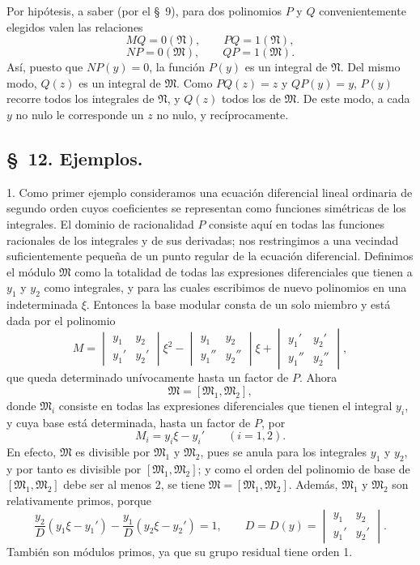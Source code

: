 Por hipótesis, a saber (por el \S~9), para dos polinomios $P$ y $Q$ convenientemente elegidos valen las relaciones
\[
 MQ=0(\mathfrak N),
 \qquad
 PQ=1(\mathfrak N),
\]
\[
 NP=0(\mathfrak M),
 \qquad
 QP=1(\mathfrak M).
\]
Así, puesto que $NP(y)=0$, la función $P(y)$ es un integral de $\mathfrak N$. Del mismo modo, $Q(z)$ es un integral de $\mathfrak M$. Como $PQ(z)=z$ y $QP(y)=y$, $P(y)$ recorre todos los integrales de $\mathfrak N$, y $Q(z)$ todos los de $\mathfrak M$. De este modo, a cada $y$ no nulo le corresponde un $z$ no nulo, y recíprocamente.

\subsection*{\S~12. Ejemplos.}

1. Como primer ejemplo consideramos una ecuación diferencial lineal ordinaria de segundo orden cuyos coeficientes se representan como funciones simétricas de los integrales. El dominio de racionalidad $P$ consiste aquí en todas las funciones racionales de los integrales y de sus derivadas; nos restringimos a una vecindad suficientemente pequeña de un punto regular de la ecuación diferencial. Definimos el módulo $\mathfrak M$ como la totalidad de todas las expresiones diferenciales que tienen a $y_1$ y $y_2$ como integrales, y para las cuales escribimos de nuevo polinomios en una indeterminada $\xi$. Entonces la base modular consta de un solo miembro y está dada por el polinomio
\[
 M=
 \begin{vmatrix} y_1&y_2\\ y_1'&y_2'\end{vmatrix}\xi^2
 -\begin{vmatrix} y_1&y_2\\ y_1''&y_2''\end{vmatrix}\xi
 +\begin{vmatrix} y_1'&y_2'\\ y_1''&y_2''\end{vmatrix},
\]
que queda determinado unívocamente hasta un factor de $P$. Ahora
\begin{equation}
 \mathfrak M=[\mathfrak M_1,
\mathfrak M_2],
\tag{41}
\end{equation}
donde $\mathfrak M_i$ consiste en todas las expresiones diferenciales que tienen el integral $y_i$, y cuya base está determinada, hasta un factor de $P$, por
\[
 M_i=y_i\xi-y_i'
 \qquad(i=1,2).
\]
En efecto, $\mathfrak M$ es divisible por $\mathfrak M_1$ y $\mathfrak M_2$, pues se anula para los integrales $y_1$ y $y_2$, y por tanto es divisible por $[\mathfrak M_1,\mathfrak M_2]$; y como el orden del polinomio de base de $[\mathfrak M_1,\mathfrak M_2]$ debe ser al menos 2, se tiene $\mathfrak M=[\mathfrak M_1,\mathfrak M_2]$. Además, $\mathfrak M_1$ y $\mathfrak M_2$ son relativamente primos, porque
\begin{equation}
 \frac{y_2}{D}(y_1\xi-y_1')-\frac{y_1}{D}(y_2\xi-y_2')=1,
 \qquad
 D=D(y)=\begin{vmatrix}y_1&y_2\\ y_1'&y_2'\end{vmatrix}.
\tag{42}
\end{equation}
También son módulos primos, ya que su grupo residual tiene orden 1.

